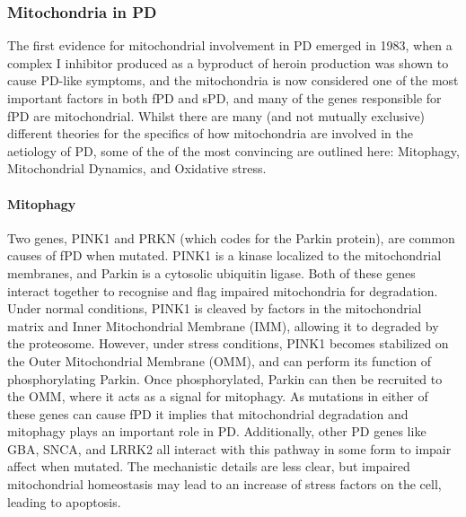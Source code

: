 \documentclass{article}
\begin{document}
\subsubsection{Mitochondria in PD}
The first evidence for mitochondrial involvement in PD emerged in 1983, when a complex I inhibitor produced as a byproduct of heroin production was shown to cause PD-like symptoms\cite{Langston1983ChronicSynthesis}, and the mitochondria is now considered one of the most important factors in both fPD and sPD\cite{Henrich2023MitochondrialPotential}, and many of the genes responsible for fPD are mitochondrial. Whilst there are many (and not mutually exclusive) different theories for the specifics of how mitochondria are involved in the aetiology of PD, some of the of the most convincing are outlined here: Mitophagy, Mitochondrial Dynamics, and Oxidative stress.
\paragraph{Mitophagy}Two genes, PINK1 and PRKN (which codes for the Parkin protein), are common causes of fPD when mutated\cite{Malpartida2021MitochondrialTherapy}. PINK1 is a kinase localized to the mitochondrial membranes\cite{Narendra2010PINK1Parkin}, and Parkin is a cytosolic ubiquitin ligase\cite{Narendra2008ParkinAutophagy}. Both of these genes interact together to recognise and flag impaired mitochondria for degradation. Under normal conditions, PINK1 is cleaved by factors in the mitochondrial matrix and Inner Mitochondrial Membrane (IMM), allowing it to degraded by the proteosome\cite{Pickles2018MitophagyMaintenance}. However, under stress conditions, PINK1 becomes stabilized on the Outer Mitochondrial Membrane (OMM), and can perform its function of phosphorylating Parkin. Once phosphorylated, Parkin can then be recruited to the OMM, where it acts as a signal for mitophagy. As mutations in either of these genes can cause fPD it implies that mitochondrial degradation and mitophagy plays an important role in PD. Additionally, other PD genes like GBA, SNCA, and LRRK2 all interact with this pathway in some form to impair affect when mutated\cite{Malpartida2021MitochondrialTherapy}. The mechanistic details are less clear, but impaired mitochondrial homeostasis may lead to an increase of stress factors on the cell, leading to apoptosis\cite{Eldeeb2022MitochondrialDisease}.
\end{document}
